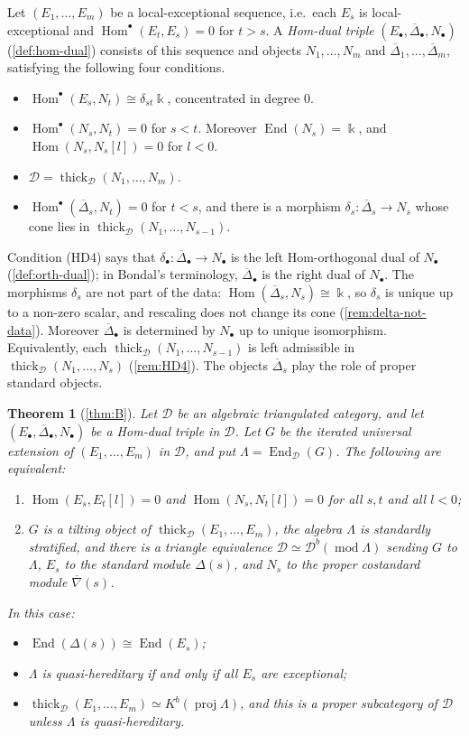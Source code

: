 \documentclass[11pt,reqno]{amsart}
\theoremstyle{plain}
\newtheorem{maintheoreminner}{Theorem}
\newenvironment{maintheorem}[1]{\renewcommand{\themaintheoreminner}{#1}\begin{maintheoreminner}}{\end{maintheoreminner}}
\theoremstyle{definition}
\theoremstyle{remark}
\newcommand{\kk}{\Bbbk}
\DeclareMathOperator{\Hom}{Hom}
\DeclareMathOperator{\End}{End}
\newcommand{\modd}{\operatorname{mod}}
\newcommand{\proj}{\operatorname{proj}}
\newcommand{\Db}{\mathcal{D}^b}
\newcommand{\Kb}{K^b}
\newcommand{\thick}[2][\cD]{\operatorname{thick}_{#1}(#2)}
\newcommand{\nablabar}{\overline{\nabla}}
\newcommand{\Deltabar}{\overline{\Delta}}
\newcommand{\cD}{\mathcal{D}}
\begin{document}
Let $(E_1,\dots,E_m)$ be a local-exceptional sequence, i.e.\ each $E_s$ is local-exceptional and $\Hom^\bullet(E_t,E_s)=0$ for $t>s$. A \emph{Hom-dual triple} $(E_\bullet,\Deltabar_\bullet,N_\bullet)$ (\cref{def:hom-dual}) consists of this sequence and objects $N_1,\dots,N_m$ and $\Deltabar_1,\dots,\Deltabar_m$, satisfying the following four conditions.
\begin{itemize}
\item[\textup{(HD1)}] $\Hom^\bullet(E_s,N_t)\cong\delta_{st}\kk$, concentrated in degree $0$.
\item[\textup{(HD2)}] $\Hom^\bullet(N_s,N_t)=0$ for $s<t$. Moreover $\End(N_s)=\kk$, and $\Hom(N_s,N_s[l])=0$ for $l<0$.
\item[\textup{(HD3)}] $\cD=\thick{N_1,\dots,N_m}$.
\item[\textup{(HD4)}] $\Hom^\bullet(\Deltabar_s,N_t)=0$ for $t<s$, and there is a morphism $\delta_s\colon\Deltabar_s\to N_s$ whose cone lies in $\thick{N_1,\dots,N_{s-1}}$.
\end{itemize}
Condition (HD4) says that $\delta_\bullet\colon\Deltabar_\bullet\to N_\bullet$ is the left Hom-orthogonal dual of $N_\bullet$ (\cref{def:orth-dual}); in Bondal's terminology, $\Deltabar_\bullet$ is the right dual of $N_\bullet$. The morphisms $\delta_s$ are not part of the data: $\Hom(\Deltabar_s,N_s)\cong\kk$, so $\delta_s$ is unique up to a non-zero scalar, and rescaling does not change its cone (\cref{rem:delta-not-data}). Moreover $\Deltabar_\bullet$ is determined by $N_\bullet$ up to unique isomorphism. Equivalently, each $\thick{N_1,\dots,N_{s-1}}$ is left admissible in $\thick{N_1,\dots,N_s}$ (\cref{rem:HD4}). The objects $\Deltabar_s$ play the role of proper standard objects.

\begin{maintheorem}{B}[\cref{thm:B}]\label{mthm:B}
Let $\cD$ be an algebraic triangulated category, and let $(E_\bullet,\Deltabar_\bullet,N_\bullet)$ be a Hom-dual triple in $\cD$. Let $G$ be the iterated universal extension of $(E_1,\dots,E_m)$ in $\cD$, and put $\Lambda=\End_\cD(G)$. The following are equivalent:
\begin{enumerate}
\item $\Hom(E_s,E_t[l])=0$ and $\Hom(N_s,N_t[l])=0$ for all $s,t$ and all $l<0$;
\item $G$ is a tilting object of $\thick{E_1,\dots,E_m}$, the algebra $\Lambda$ is standardly stratified, and there is a triangle equivalence $\cD\simeq\Db(\modd\Lambda)$ sending $G$ to $\Lambda$, $E_s$ to the standard module $\Delta(s)$, and $N_s$ to the proper costandard module $\nablabar(s)$.
\end{enumerate}
In this case:
\begin{itemize}
\item $\End(\Delta(s))\cong\End(E_s)$;
\item $\Lambda$ is quasi-hereditary if and only if all $E_s$ are exceptional;
\item $\thick{E_1,\dots,E_m}\simeq\Kb(\proj\Lambda)$, and this is a proper subcategory of $\cD$ unless $\Lambda$ is quasi-hereditary.
\end{itemize}
\end{maintheorem}
\end{document}
